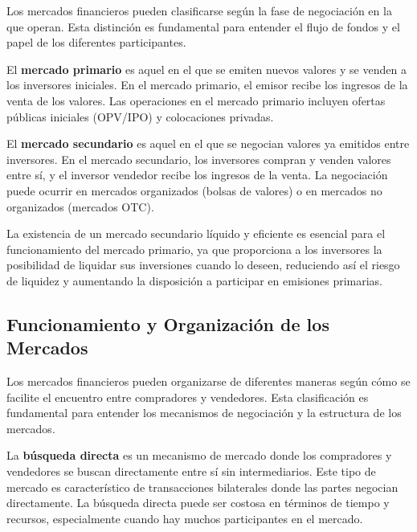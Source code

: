 Los mercados financieros pueden clasificarse según la fase de negociación en la que operan. Esta distinción es fundamental para entender el flujo de fondos y el papel de los diferentes participantes.

\begin{definicion}
El \textbf{mercado primario} es aquel en el que se emiten nuevos valores y se venden a los inversores iniciales. En el mercado primario, el emisor recibe los ingresos de la venta de los valores. Las operaciones en el mercado primario incluyen ofertas públicas iniciales (OPV/IPO) y colocaciones privadas.
\end{definicion}

\begin{definicion}
El \textbf{mercado secundario} es aquel en el que se negocian valores ya emitidos entre inversores. En el mercado secundario, los inversores compran y venden valores entre sí, y el inversor vendedor recibe los ingresos de la venta. La negociación puede ocurrir en mercados organizados (bolsas de valores) o en mercados no organizados (mercados OTC).
\end{definicion}

\begin{proposicion}
La existencia de un mercado secundario líquido y eficiente es esencial para el funcionamiento del mercado primario, ya que proporciona a los inversores la posibilidad de liquidar sus inversiones cuando lo deseen, reduciendo así el riesgo de liquidez y aumentando la disposición a participar en emisiones primarias.
\end{proposicion}

\subsection{Funcionamiento y Organización de los Mercados}

Los mercados financieros pueden organizarse de diferentes maneras según cómo se facilite el encuentro entre compradores y vendedores. Esta clasificación es fundamental para entender los mecanismos de negociación y la estructura de los mercados.

\begin{definicion}
La \textbf{búsqueda directa} es un mecanismo de mercado donde los compradores y vendedores se buscan directamente entre sí sin intermediarios. Este tipo de mercado es característico de transacciones bilaterales donde las partes negocian directamente. La búsqueda directa puede ser costosa en términos de tiempo y recursos, especialmente cuando hay muchos participantes en el mercado.
\end{definicion}

